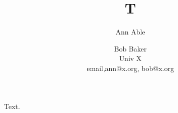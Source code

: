 \documentclass{article}
\title{T}\author{Ann Able \and Bob Baker\\ Univ X\\ email,ann@x.org, bob@x.org}
\begin{document}
\maketitle
Text.
\end{document}
